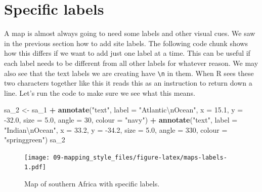 \documentclass[
]{book}
\newenvironment{Shaded}{\begin{snugshade}}{\end{snugshade}}
\newcommand{\CharTok}[1]{\textcolor[rgb]{0.31,0.60,0.02}{#1}}
\newcommand{\DataTypeTok}[1]{\textcolor[rgb]{0.13,0.29,0.53}{#1}}
\newcommand{\DecValTok}[1]{\textcolor[rgb]{0.00,0.00,0.81}{#1}}
\newcommand{\FloatTok}[1]{\textcolor[rgb]{0.00,0.00,0.81}{#1}}
\newcommand{\KeywordTok}[1]{\textcolor[rgb]{0.13,0.29,0.53}{\textbf{#1}}}
\newcommand{\NormalTok}[1]{#1}
\newcommand{\OperatorTok}[1]{\textcolor[rgb]{0.81,0.36,0.00}{\textbf{#1}}}
\newcommand{\StringTok}[1]{\textcolor[rgb]{0.31,0.60,0.02}{#1}}
\begin{document}
\hypertarget{specific-labels}{%
\section{Specific labels}\label{specific-labels}}

A map is almost always going to need some labels and other visual cues. We saw in the previous section how to add site labels. The following code chunk shows how this differs if we want to add just one label at a time. This can be useful if each label needs to be different from all other labels for whatever reason. We may also see that the text labels we are creating have \texttt{\textbackslash{}n} in them. When R sees these two characters together like this it reads this as an instruction to return down a line. Let's run the code to make sure we see what this means.

\begin{Shaded}
\begin{Highlighting}[]
\NormalTok{sa\_}\DecValTok{2}\NormalTok{ <{-}}\StringTok{ }\NormalTok{sa\_}\DecValTok{1} \OperatorTok{+}
\StringTok{  }\KeywordTok{annotate}\NormalTok{(}\StringTok{"text"}\NormalTok{, }\DataTypeTok{label =} \StringTok{"Atlantic}\CharTok{\textbackslash{}n}\StringTok{Ocean"}\NormalTok{, }
           \DataTypeTok{x =} \FloatTok{15.1}\NormalTok{, }\DataTypeTok{y =} \FloatTok{{-}32.0}\NormalTok{, }
           \DataTypeTok{size =} \FloatTok{5.0}\NormalTok{, }
           \DataTypeTok{angle =} \DecValTok{30}\NormalTok{, }
           \DataTypeTok{colour =} \StringTok{"navy"}\NormalTok{) }\OperatorTok{+}
\StringTok{  }\KeywordTok{annotate}\NormalTok{(}\StringTok{"text"}\NormalTok{, }\DataTypeTok{label =} \StringTok{"Indian}\CharTok{\textbackslash{}n}\StringTok{Ocean"}\NormalTok{, }
           \DataTypeTok{x =} \FloatTok{33.2}\NormalTok{, }\DataTypeTok{y =} \FloatTok{{-}34.2}\NormalTok{, }
           \DataTypeTok{size =} \FloatTok{5.0}\NormalTok{, }
           \DataTypeTok{angle =} \DecValTok{330}\NormalTok{, }
           \DataTypeTok{colour =} \StringTok{"springgreen"}\NormalTok{)}
\NormalTok{sa\_}\DecValTok{2}
\end{Highlighting}
\end{Shaded}

\begin{figure}
\centering
\texttt{[image: 09-mapping\_style\_files/figure-latex/maps-labels-1.pdf]}
\caption{\label{fig:maps-labels}Map of southern Africa with specific labels.}
\end{figure}
\end{document}
